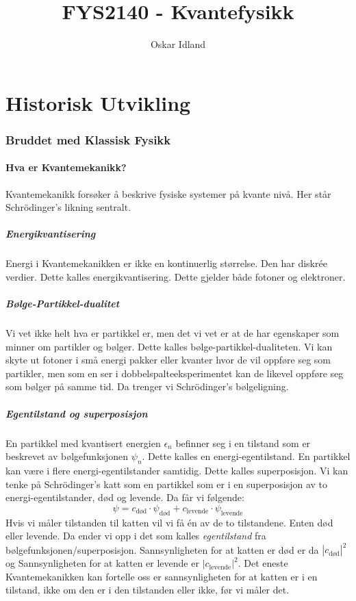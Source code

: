 \documentclass{article}
\author{Oskar Idland}
\title{FYS2140 - Kvantefysikk}
\date{}
\begin{document}
\maketitle
\newpage
\tableofcontents
\newpage
\part{Historisk Utvikling}
\section{Bruddet med Klassisk Fysikk}
\subsection{Hva er Kvantemekanikk?} 
Kvantemekanikk forsøker å beskrive fysiske systemer på kvante nivå. Her står Schrödinger's likning sentralt. 

\subsubsection*{Energikvantisering}
Energi i Kvantemekanikken er ikke en kontinuerlig størrelse. Den har diskrée verdier. Dette kalles energikvantisering. Dette gjelder både fotoner og elektroner. 

\subsubsection*{Bølge-Partikkel-dualitet}
Vi vet ikke helt hva er partikkel er, men det vi vet er at de har egenskaper som minner om partikler og bølger. Dette kalles bølge-partikkel-dualiteten. Vi kan skyte ut fotoner i små energi pakker eller kvanter hvor de vil oppføre seg som partikler, men som en ser i dobbelspalteeksperimentet kan de likevel oppføre seg som bølger på samme tid. Da trenger vi Schrödinger's bølgeligning.

\subsubsection*{Egentilstand og superposisjon}
En partikkel med kvantisert energien $ ϵ_{n} $ befinner seg i en tilstand som er beskrevet av bølgefunksjonen $ ψ_{n} $. Dette kalles en energi-egentilstand. En partikkel kan være i flere energi-egentilstander samtidig. Dette kalles superposisjon. Vi kan tenke på Schrödinger's katt som en partikkel som er i en superposisjon av to energi-egentilstander, død og levende. Da får vi følgende:
\[
ψ = c_{\text{død}} ⋅ ψ_{\text{død}} + c_{\text{levende}} ⋅ ψ_{\text{levende}}
\]
Hvis vi måler tilstanden til katten vil vi få én av de to tilstandene. Enten død eller levende. Da ender vi opp i det som kalles \textit{egentilstand} fra bølgefunksjonen/superposisjon. Sannsynligheten for at katten er død er da $ \left\vert c_{\text{død}} \right\vert ^{2} $ og Sannsynligheten for at katten er levende er $ \left\vert c_{\text{levende}} \right\vert ^{2} $. Det eneste Kvantemekanikken kan fortelle oss er sannsynligheten for at katten er i en tilstand, ikke om den er i den tilstanden eller ikke, før vi måler det. 
\end{document}
